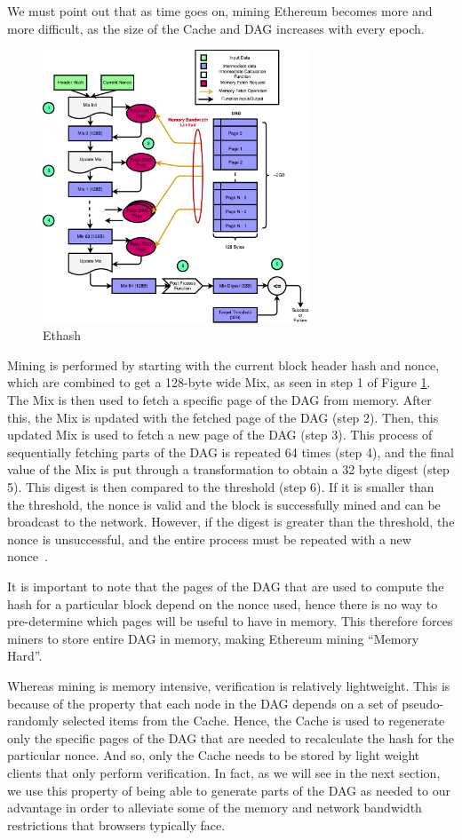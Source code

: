 \documentclass[runningheads]{llncs}
\begin{document}
We must point out that as time goes on, mining Ethereum becomes more and more difficult, as the size of the Cache and DAG increases with every epoch. 

\begin{figure}[h]
\centering
\includegraphics[width=300px,keepaspectratio]{Ethash.pdf}
\caption{Ethash}
\label{fig:ethash}
\end{figure}

Mining is performed by starting with the current block header hash and nonce, which are combined to get a 128-byte wide Mix, as seen in step 1 of Figure \ref{fig:ethash}. The Mix is then used to fetch a specific page of the DAG from memory. After this, the Mix is updated with the fetched page of the DAG (step 2). Then, this updated Mix is used to fetch a new page of the DAG (step 3). This process of sequentially fetching parts of the DAG is repeated 64 times (step 4), and the final value of the Mix is put through a transformation to obtain a 32 byte digest (step 5). This digest is then compared to the threshold (step 6). If it is smaller than the threshold, the nonce is valid and the block is successfully mined and can be broadcast to the network. However, if the digest is greater than the threshold, the nonce is unsuccessful, and the entire process must be repeated with a new nonce~\cite{Ethmining}. 


It is important to note that the pages of the DAG that are used to compute the hash for a particular block depend on the nonce used, hence there is no way to pre-determine which pages will be useful to have in memory. This therefore forces miners to store entire DAG in memory, making Ethereum mining ``Memory Hard''. 


Whereas mining is memory intensive, verification is relatively lightweight. This is because of the property that each node in the DAG depends on a set of pseudo-randomly selected items from the Cache. Hence, the Cache is used to regenerate only the specific pages of the DAG that are needed to recalculate the hash for the particular nonce. And so, only the Cache needs to be stored by light weight clients that only perform verification. In fact, as we will see in the next section, we use this property of being able to generate parts of the DAG as needed to our advantage in order to alleviate some of the memory and network bandwidth restrictions that browsers typically face.
\end{document}
